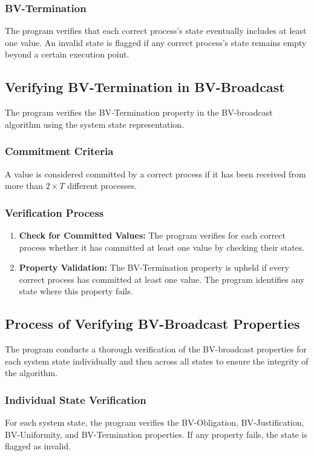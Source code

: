 \documentclass[a4paper,11pt,oneside]{report}
\begin{document}
\subsubsection{BV-Termination}
The program verifies that each correct process's state eventually includes at least one value. An invalid state is flagged if any correct process's state remains empty beyond a certain execution point.

\subsection{Verifying BV-Termination in BV-Broadcast}
The program verifies the BV-Termination property in the BV-broadcast algorithm using the system state representation.

\subsubsection{Commitment Criteria}
A value is considered committed by a correct process if it has been received from more than \( 2 \times T \) different processes.

\subsubsection{Verification Process}
\begin{enumerate}
    \item \textbf{Check for Committed Values:} The program verifies for each correct process whether it has committed at least one value by checking their states.
    \item \textbf{Property Validation:} The BV-Termination property is upheld if every correct process has committed at least one value. The program identifies any state where this property fails.
\end{enumerate}

\subsection{Process of Verifying BV-Broadcast Properties}
The program conducts a thorough verification of the BV-broadcast properties for each system state individually and then across all states to ensure the integrity of the algorithm.

\subsubsection{Individual State Verification}
For each system state, the program verifies the BV-Obligation, BV-Justification, BV-Uniformity, and BV-Termination properties. If any property fails, the state is flagged as invalid.
\end{document}
